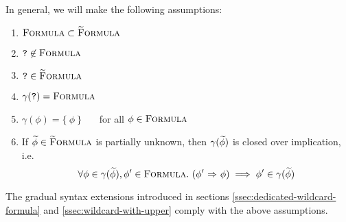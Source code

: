 In general, we will make the following assumptions:
\begin{enumerate}
    \item $\textup{\textsc{Formula}} \subset \textup{\textsc{\ensuremath{\widetilde{\text{F}}}ormula}}$
    \item $\textup{\texttt{?}} \not \in \textup{\textsc{Formula}}$
    \item $\textup{\texttt{?}} \in \textup{\textsc{\ensuremath{\widetilde{\text{F}}}ormula}}$
    \item $\gamma(\textup{\texttt{?}}) = \textup{\textsc{Formula}}$
    \item $\gamma(\phi) = \{~\phi~\}$ ~~~for all $\phi \in \textup{\textsc{Formula}}$
    \item If $\widetilde{\phi} \in \textup{\textsc{\ensuremath{\widetilde{\text{F}}}ormula}}$ is partially unknown, then $\gamma(\widetilde{\phi})$ is closed over implication, i.e.
    \begin{displaymath}
    \forall \phi \in \gamma(\widetilde{\phi}), \phi' \in \textup{\textsc{Formula}}.~ ({\phi'} \,\,{\Rightarrow}\,\, {\phi}) \implies \phi' \in \gamma(\widetilde{\phi})
    \end{displaymath}
\end{enumerate}

The gradual syntax extensions introduced in sections \ref{ssec:dedicated-wildcard-formula} and \ref{ssec:wildcard-with-upper} comply with the above assumptions.